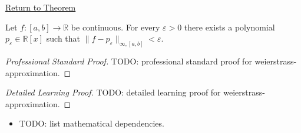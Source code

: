 \newpage
{}
\label{prf:weierstrass-approximation}

\begin{remark*}[Return]
\hyperref[thm:weierstrass-approximation]{Return to Theorem}
\end{remark*}

\begin{theorem*}
Let $f:[a,b]\to\mathbb{R}$ be continuous. For every $\varepsilon>0$ there exists a polynomial $p_\varepsilon\in\mathbb{R}[x]$ such that $\|f-p_\varepsilon\|_{\infty,[a,b]}<\varepsilon$.
\end{theorem*}

\begin{proof}[Professional Standard Proof]
\LRAProofBodyStart
TODO: professional standard proof for weierstrass-approximation.
\end{proof}

\begin{proof}[Detailed Learning Proof]
\LRAProofBodyStart
TODO: detailed learning proof for weierstrass-approximation.
\end{proof}

\begin{remark*}
\end{remark*}

\begin{dependencies}
\begin{itemize}
  \item TODO: list mathematical dependencies.
\end{itemize}
\end{dependencies}

\clearpage
